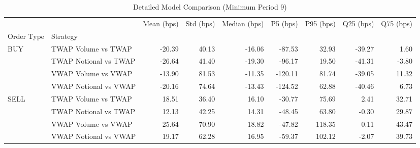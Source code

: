 \begin{table}
\caption{Detailed Model Comparison (Minimum Period 9)}
\label{tab:detailed_min_period_9}
\begin{tabular}{l|l|rrrrrrr}
\toprule
 &  & Mean (bps) & Std (bps) & Median (bps) & P5 (bps) & P95 (bps) & Q25 (bps) & Q75 (bps) \\
Order Type & Strategy &  &  &  &  &  &  &  \\
\midrule
\multirow[t]{4}{*}{BUY} & TWAP Volume vs TWAP & -20.39 & 40.13 & -16.06 & -87.53 & 32.93 & -39.27 & 1.60 \\
 & TWAP Notional vs TWAP & -26.64 & 41.40 & -19.30 & -96.17 & 19.50 & -41.31 & -3.80 \\
 & VWAP Volume vs VWAP & -13.90 & 81.53 & -11.35 & -120.11 & 81.74 & -39.05 & 11.32 \\
 & VWAP Notional vs VWAP & -20.16 & 74.64 & -13.43 & -124.52 & 62.88 & -40.46 & 6.73 \\
\cline{1-9}
\multirow[t]{4}{*}{SELL} & TWAP Volume vs TWAP & 18.51 & 36.40 & 16.10 & -30.77 & 75.69 & 2.41 & 32.71 \\
 & TWAP Notional vs TWAP & 12.13 & 42.25 & 14.31 & -48.45 & 63.80 & -0.30 & 29.87 \\
 & VWAP Volume vs VWAP & 25.64 & 70.90 & 18.82 & -47.82 & 118.35 & 0.11 & 43.47 \\
 & VWAP Notional vs VWAP & 19.17 & 62.28 & 16.95 & -59.37 & 102.12 & -2.07 & 39.73 \\
\cline{1-9}
\bottomrule
\end{tabular}
\end{table}
